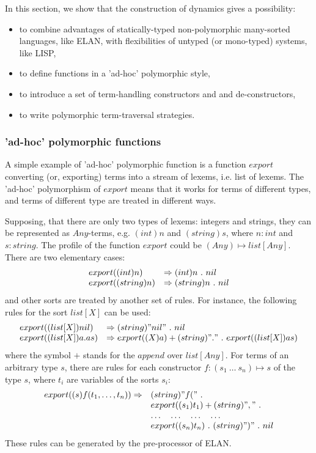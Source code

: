\documentclass{article}
\begin{document}
{In this section, we show that the construction of dynamics gives 
a possibility:
\begin{itemize}
 \item
   to combine advantages of statically-typed non-polymorphic 
   many-sorted languages, like ELAN,
   with flexibilities of untyped (or mono-typed) systems, like LISP,
 \item
   to define functions in a 'ad-hoc' polymorphic style,
 \item
   to introduce a set of term-handling constructors and and de-constructors,
 \item
   to write polymorphic term-traversal strategies.
\end{itemize}

\subsubsection{'ad-hoc' polymorphic functions}

A simple example of 'ad-hoc' polymorphic function is a function $export$
converting (or, exporting) terms into a stream of lexems, i.e. list of lexems.
The 'ad-hoc' polymorphism of $export$ means that it works
for terms of different types, and terms of different type are treated
in different ways.

Supposing, that there are only two types of lexems: 
integers and strings,
they can be represented as $Any$-terms, e.g.
$(int)n$ and $(string)s$, where $n:int$ and $s:string$. 
The profile of the function $export$ could be $(Any) \mapsto list[Any]$.
There are two elementary cases:
\[\begin{array}{ll}
  export((int)n)     & \rewrite (int)n ~.~ nil \\
  export((string)n)  & \rewrite (string)n ~.~ nil \\
\end{array}\]
and other sorts are treated by another set of rules.
For instance, the following rules for the sort $list[X]$ 
can be used:
\[\begin{array}{ll}
  export((list[X])nil)     & \rewrite (string)"nil" ~.~nil \\
  export((list[X])a.as)    & \rewrite 
       export((X)a) + (string)"." ~.~ export((list[X])as)
\end{array}\]
where the symbol $+$ stands for the $append$ over $list[Any]$.
For terms of an arbitrary type $s$, there are rules for
each constructor $f : (s_1~ \dots~ s_n) \mapsto s$ 
of the type $s$, where $t_i$ are variables of the sorts $s_i$:
\[\begin{array}{ll}
  export((s)f(t_1,\dots,t_n)) \rewrite & (string)"f(" ~.~ \\
  & export((s_1)t_1) + (string)"," ~.~ \\
  & \dots  \quad \dots \quad  \dots \quad \dots \\
  & export((s_n)t_n) ~.~ (string)")" ~.~ nil
\end{array}\]
These rules can be generated by the pre-processor of ELAN.

}
\end{document}
